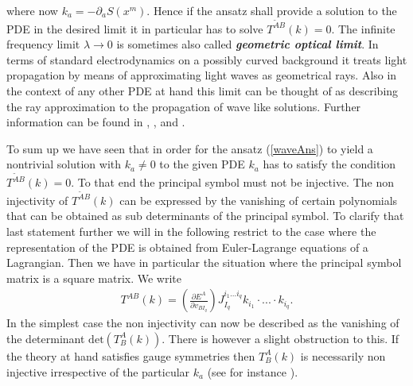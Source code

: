 \documentclass[a4paper,12pt, DIV=14, BCOR=5mm, twoside, headsepline, numbers=noenddot]{scrbook}
\begin{document}
where now $k_a = - \partial_aS(x^m)$. Hence if the ansatz shall provide a solution to the PDE in the desired limit it in particular has to solve $T^{\tilde{A} B}(k) = 0$. The infinite frequency limit $\lambda \rightarrow 0 $ is sometimes also called \textit{\textbf{geometric optical limit}}. In terms of standard electrodynamics on a possibly curved background it treats light propagation by means of approximating light waves as geometrical rays. Also in the context of any other PDE at hand this limit can be thought of as describing the ray approximation to the propagation of wave like solutions. Further information can be found in \cite{seiler1994analysis}, \cite{2012arXiv1211.1914K}, \cite{2011PhRvD..83d4047R} and \cite{2018PhRvD..97h4036D}.

To sum up we have seen that in order for the ansatz (\ref{waveAns}) to yield a nontrivial solution with $k_a \neq 0$ to the given PDE $k_a$ has to satisfy the condition $T^{\tilde{A} B}(k) = 0$. To that end the principal symbol must not be injective. The non injectivity of $T^{\tilde{A} B}(k)$ can be expressed by the vanishing of certain polynomials that can be obtained  as sub determinants of the principal symbol. To clarify that last statement further we will in the following restrict to the case where the representation of the PDE is obtained from Euler-Lagrange equations of a Lagrangian. Then we have in particular the situation where the principal symbol matrix is a square matrix. We write 
\begin{align}
T^{A B}(k) =  \left ( \frac{\partial E^{A}}{\partial v_{BI_q}} \right ) J_{I_q}^{i_1...i_q} k_{i_1} \cdot ... \cdot k_{i_q}.
\end{align}
In the simplest case the non injectivity can now be described as the vanishing of the determinant $\mathrm{det}(T^A_B(k))$. There is however a slight obstruction to this. If the theory at hand satisfies gauge symmetries then $T^A_B(k)$ is necessarily non injective irrespective of the particular $k_a$ (see for instance \cite{2018PhRvD..97h4036D}).
\end{document}
